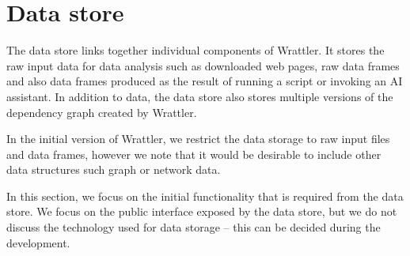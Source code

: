 \documentclass[sigplan,preprint,10pt]{acmart}\settopmatter{printfolios=true,printccs=false,printacmref=false}
\begin{document}
{\begin{comment}
*Input*:  A data frame, along with type information (continuous/categorical) for each of the columns. Desired number $k$ of rows in output.

*Output*: A list of $k$ indices of rows in the dataframe

*Potential method*:  Simplest possible implementation:
Run $k$-medoids and return the medoid values.

*Research questions:* First, are there research questions here, or is this so simple
that it  is part of the infrastructure?  If $k$-medoids is so simple for this,
why doesn't everyone also do it? How to evaluate whether the summary is good?
Maybe there are examples of data sets where medoids is not good.
For example, in the Karpathy ICML example, medoids would not make sense,
listing the institutions that have the most papers is most informative, because
it's a "long tail" type of column. How do you tell "long tail" data from "just show
the clusters" type data? Perhaps a model-based framework could distinguish?
Maybe you want to summarize the ways in which two data sets differ?
Is the best summary the cluster centroids or the "top k" along some value?
* *User interaction:* I'm not sure what interactions are enecessary.
Users could ask for more rows, mark two items as similar, or mark an item as uninteresting.
Or perhaps better would be to allow drill down, i.e., to make it easy to explore
the clusters represented by each example.
}
\end{comment}

\section{Data store}
\label{sec:datastore}

The data store links together individual components of Wrattler. It stores the raw input
data for data analysis such as downloaded web pages, raw data frames and also data frames
produced as the result of running a script or invoking an AI assistant. In addition to data,
the data store also stores multiple versions of the dependency graph created by Wrattler.

In the initial version of Wrattler, we restrict the data storage to raw input files and
data frames, however we note that it would be desirable to include other data structures
such graph or network data.

In this section, we focus on the initial functionality that is
required from the data store.  We focus on the public interface
exposed by the data store, but we do not discuss the technology used
for data storage -- this can be decided during the development.

}
\end{document}
